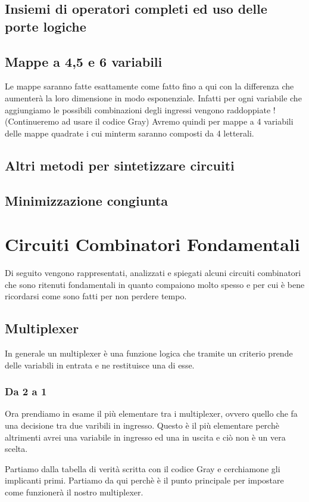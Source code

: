 \documentclass[a4paper]{book}
\begin{document}
\newpage
\section{Insiemi di operatori completi ed uso delle porte logiche}

\section{Mappe a 4,5 e 6 variabili}
Le mappe saranno fatte esattamente come fatto fino a qui con la differenza che aumenterà la loro dimensione in modo esponenziale.
Infatti per ogni variabile che aggiungiamo le possibili combinazioni degli ingressi vengono raddoppiate !
(Continueremo ad usare il codice Gray)
Avremo quindi per mappe a 4 variabili delle mappe quadrate i cui minterm saranno composti da 4 letterali.

\section{Altri metodi per sintetizzare circuiti}
\section{Minimizzazione congiunta}
\newpage	
\chapter{Circuiti Combinatori Fondamentali}

Di seguito vengono rappresentati, analizzati e spiegati alcuni circuiti combinatori che sono ritenuti fondamentali in quanto compaiono molto spesso e per cui è bene ricordarsi come sono fatti per non perdere tempo.
\section{Multiplexer}
In generale un multiplexer è una funzione logica che tramite un criterio prende delle variabili in entrata e ne restituisce una di esse.
\subsection{Da 2 a 1}
Ora prendiamo in esame il più elementare tra i multiplexer, ovvero quello che fa una decisione tra due varibili in ingresso.
Questo è il più elementare perchè altrimenti avrei una variabile in ingresso ed una in uscita e ciò non è un vera scelta.

Partiamo dalla tabella di verità scritta con il codice Gray e cerchiamone gli implicanti primi.
Partiamo da qui perchè è il punto principale per impostare come funzionerà il nostro multiplexer.\\
\end{document}
